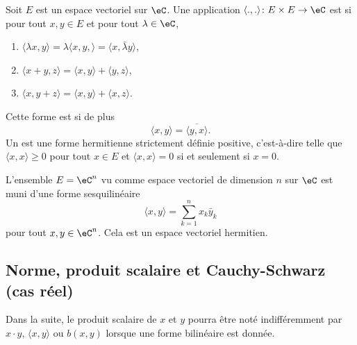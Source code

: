 \begin{definition}  \label{DefMZQxmQ}
    Soit \( E\) est un espace vectoriel sur \( \eC\). Une application \( \langle ., .\rangle \colon E\times E\to \eC\) est  si pour tout \( x,y\in E\) et pour tout \( \lambda\in \eC\),
    \begin{enumerate}
        \item
            \( \langle \lambda x, y\rangle =\lambda\langle x,y, \rangle =\langle x, \bar\lambda y\rangle \),
        \item
            \( \langle x+y, z\rangle =\langle x, y\rangle+\langle y, z\rangle  \),
        \item
            \( \langle x, y+z\rangle =\langle x, y\rangle +\langle x, z\rangle \).
    \end{enumerate}
    Cette forme est  si de plus
    \begin{equation}
        \langle x, y\rangle =\overline{ \langle y, x\rangle  }.
    \end{equation}
    Un  est une forme hermitienne strictement définie positive, c'est-à-dire telle que \( \langle x, x\rangle \geq 0\) pour tout \( x\in E\) et \( \langle x, x\rangle =0\) si et seulement si \( x=0\).
\end{definition}

\begin{example}
    L'ensemble \( E=\eC^n\) vu comme espace vectoriel de dimension \( n\) sur \( \eC\)  est muni d'une forme sesquilinéaire
    \begin{equation}    \label{EqFormSesqQrjyPH}
        \langle x, y\rangle =\sum_{k=1}^nx_k\bar y_k
    \end{equation}
    pour tout \( x,y\in\eC^n\). Cela est un espace vectoriel hermitien.
\end{example}

\subsection{Norme, produit scalaire et Cauchy-Schwarz (cas réel)}

Dans la suite, le produit scalaire de \( x\) et \( y\) pourra être noté indifféremment par \( x\cdot y\), \( \langle x, y\rangle \) ou \( b(x,y)\) lorsque une forme bilinéaire est donnée.

